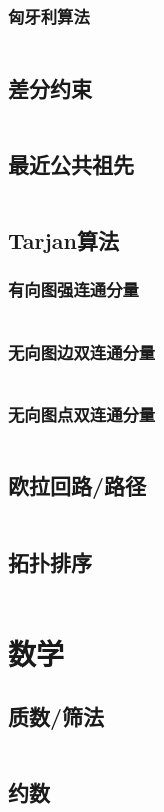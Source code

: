 \documentclass[a4paper,12pt]{article}
\begin{document}
\subsubsection{匈牙利算法} 
\inputminted[breaklines]{c++}{graph/2graph/xyl.cc}
\subsection{差分约束} %
\inputminted[breaklines]{c++}{graph/cfys/cfys.cc}
\subsection{最近公共祖先} %
\inputminted[breaklines]{c++}{graph/lca/lca.cc}
\subsection{Tarjan算法} %
\subsubsection{有向图强连通分量} 
\inputminted[breaklines]{c++}{graph/tarjan/scc.cc}
\subsubsection{无向图边双连通分量} 
\inputminted[breaklines]{c++}{graph/tarjan/edcc.cc}
\subsubsection{无向图点双连通分量} 
\inputminted[breaklines]{c++}{graph/tarjan/vdcc.cc}
\subsection{欧拉回路/路径} %
\inputminted[breaklines]{c++}{graph/eluer/eluer.cc}
\subsection{拓扑排序} %
\inputminted[breaklines]{c++}{graph/topsort/top.cc}

\newpage
\section{数学}
\subsection{质数/筛法}
\inputminted[breaklines]{c++}{math/prime.cc}
\subsection{约数}
\inputminted[breaklines]{c++}{math/yueshu.cc}
\end{document}
